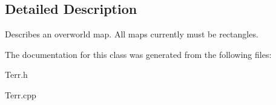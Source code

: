 \subsection{Detailed Description}
Describes an overworld map. All maps currently must be rectangles. 

The documentation for this class was generated from the following files\+:\begin{DoxyCompactItemize}
\item 
Terr.\+h\item 
Terr.\+cpp\end{DoxyCompactItemize}
